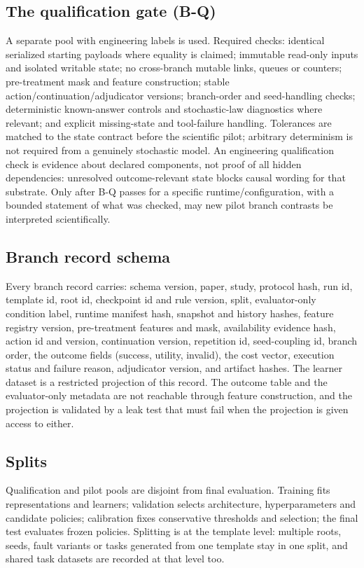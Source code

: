 \subsection{The qualification gate (B-Q)}

A separate pool with engineering labels is used.  Required checks: identical
serialized starting payloads where equality is claimed; immutable read-only
inputs and isolated writable state; no cross-branch mutable links, queues or
counters; pre-treatment mask and feature construction; stable
action/continuation/adjudicator versions; branch-order and seed-handling checks;
deterministic known-answer controls and stochastic-law diagnostics where
relevant; and explicit missing-state and tool-failure handling.  Tolerances are
matched to the state contract before the scientific pilot; arbitrary determinism
is not required from a genuinely stochastic model.  An engineering qualification
check is evidence about declared components, not proof of all hidden
dependencies: unresolved outcome-relevant state blocks causal wording for that
substrate.  Only after B-Q passes for a specific runtime/configuration, with a
bounded statement of what was checked, may new pilot branch contrasts be
interpreted scientifically.

\subsection{Branch record schema}

Every branch record carries: schema version, paper, study, protocol hash, run
id, template id, root id, checkpoint id and rule version, split, evaluator-only
condition label, runtime manifest hash, snapshot and history hashes, feature
registry version, pre-treatment features and mask, availability evidence hash,
action id and version, continuation version, repetition id, seed-coupling id,
branch order, the outcome fields (success, utility, invalid), the cost vector,
execution status and failure reason, adjudicator version, and artifact hashes.
The learner dataset is a restricted projection of this record.  The outcome
table and the evaluator-only metadata are not reachable through feature
construction, and the projection is validated by a leak test that must fail
when the projection is given access to either.

\subsection{Splits}

Qualification and pilot pools are disjoint from final evaluation.  Training fits
representations and learners; validation selects architecture, hyperparameters
and candidate policies; calibration fixes conservative thresholds and selection;
the final test evaluates frozen policies.  Splitting is at the template level:
multiple roots, seeds, fault variants or tasks generated from one template stay
in one split, and shared task datasets are recorded at that level too.

